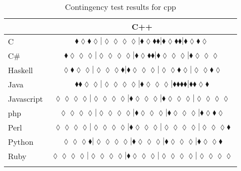 \begin{table*}
\centering
\begin{tabular}{l c}
& C++ \\
\hline

C & $\scriptscriptstyle\blacklozenge\lozenge\blacklozenge\lozenge|\lozenge\lozenge\lozenge\lozenge|\blacklozenge\lozenge\blacklozenge\blacklozenge|\blacklozenge\lozenge\blacklozenge\blacklozenge|\blacklozenge\lozenge\blacklozenge\lozenge$ \\
C\# & $\scriptscriptstyle\blacklozenge\lozenge\lozenge\lozenge|\lozenge\lozenge\lozenge\lozenge|\blacklozenge\lozenge\blacklozenge\blacklozenge|\blacklozenge\lozenge\lozenge\lozenge|\blacklozenge\lozenge\lozenge\lozenge$ \\
Haskell & $\scriptscriptstyle\lozenge\blacklozenge\lozenge\lozenge|\lozenge\lozenge\lozenge\blacklozenge|\blacklozenge\lozenge\lozenge\lozenge|\lozenge\lozenge\blacklozenge\lozenge|\lozenge\lozenge\blacklozenge\lozenge$ \\
Java & $\scriptscriptstyle\blacklozenge\blacklozenge\lozenge\lozenge|\lozenge\lozenge\lozenge\lozenge|\blacklozenge\lozenge\lozenge\lozenge|\blacklozenge\blacklozenge\blacklozenge\blacklozenge|\blacklozenge\blacklozenge\lozenge\blacklozenge$ \\
Javascript & $\scriptscriptstyle\lozenge\lozenge\lozenge\lozenge|\lozenge\lozenge\lozenge\lozenge|\blacklozenge\lozenge\lozenge\lozenge|\blacklozenge\lozenge\lozenge\lozenge|\lozenge\lozenge\lozenge\lozenge$ \\
{\sc php} & $\scriptscriptstyle\lozenge\lozenge\lozenge\lozenge|\lozenge\lozenge\lozenge\lozenge|\blacklozenge\lozenge\lozenge\lozenge|\blacklozenge\lozenge\lozenge\lozenge|\blacklozenge\lozenge\blacklozenge\lozenge$ \\
Perl & $\scriptscriptstyle\lozenge\lozenge\lozenge\lozenge|\lozenge\lozenge\lozenge\lozenge|\blacklozenge\lozenge\lozenge\lozenge|\lozenge\lozenge\lozenge\lozenge|\lozenge\lozenge\lozenge\blacklozenge$ \\
Python & $\scriptscriptstyle\lozenge\lozenge\lozenge\blacklozenge|\lozenge\lozenge\lozenge\lozenge|\blacklozenge\lozenge\lozenge\lozenge|\blacklozenge\lozenge\lozenge\lozenge|\blacklozenge\lozenge\lozenge\blacklozenge$ \\
Ruby & $\scriptscriptstyle\lozenge\lozenge\lozenge\lozenge|\lozenge\lozenge\lozenge\lozenge|\blacklozenge\lozenge\lozenge\lozenge|\lozenge\lozenge\lozenge\lozenge|\lozenge\lozenge\lozenge\lozenge$ \\

\hline
& \\
\end{tabular}
\caption{Contingency test results for cpp}
\label{tbl:contingency-test-results-cpp}
\end{table*}


